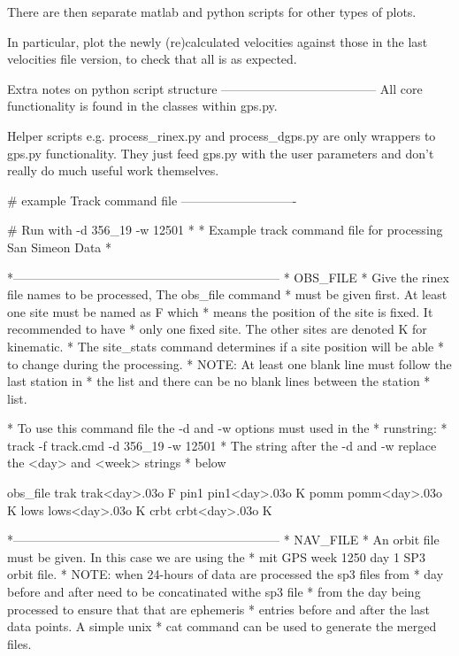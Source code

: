 \documentclass[11pt]{article} %
\begin{document}
There are then separate matlab and python scripts for other types of plots.

In particular, plot the newly (re)calculated velocities against those in the last velocities file version, to check that all is as expected.

	
	
Extra notes on python script structure
--------------------------------------
All core functionality is found in the classes within gps.py.

Helper scripts e.g. process_rinex.py and process_dgps.py are only wrappers to gps.py functionality. They just feed gps.py with the user parameters and don't really do much useful work themselves.
	
	
	
	

# example Track command file
----------------------------

# Run with -d 356_19 -w 12501
*
* Example track command file for processing San Simeon Data
*

*-----------------------------------------------------------------
* OBS_FILE
* Give the rinex file names to be processed,  The obs_file command
* must be given first.  At least one site must be named as F which
* means the position of the site is fixed.  It recommended to have
* only one fixed site.  The other sites are denoted K for kinematic.
* The site_stats command determines if a site position will be able
* to change during the processing.
* NOTE: At least one blank line must follow the last station in
* the list and there can be no blank lines between the station
* list.

* To use this command file the -d and -w options must used in the
* runstring:
* track -f track.cmd -d 356_19 -w 12501
* The string after the -d and -w replace the <day> and <week> strings
* below

 obs_file 
   trak trak<day>.03o F
   pin1 pin1<day>.03o K
   pomm pomm<day>.03o K
   lows lows<day>.03o K
   crbt crbt<day>.03o K

*-----------------------------------------------------------------
* NAV_FILE
* An orbit file must be given.  In this case we are using the
* mit GPS week 1250 day 1 SP3 orbit file.
* NOTE: when 24-hours of data are processed the sp3 files from
* day before and after need to be concatinated withe sp3 file
* from the day being processed to ensure that that are ephemeris
* entries before and after the last data points.  A simple unix
* cat command can be used to generate the merged files.
\end{document}
